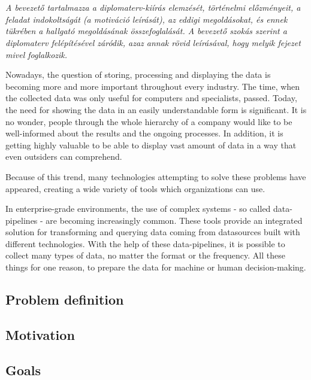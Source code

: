 \chapter{\bevezetes}

\textit{A bevezető tartalmazza a diplomaterv-kiírás elemzését, történelmi előzményeit, a feladat indokoltságát (a motiváció leírását), az eddigi megoldásokat, és ennek tükrében a hallgató megoldásának összefoglalását.
A bevezető szokás szerint a diplomaterv felépítésével záródik, azaz annak rövid leírásával, hogy melyik fejezet mivel foglalkozik.}


Nowadays, the question of storing, processing and displaying the data is becoming more and more important throughout every industry. The time, when the collected data was only useful for computers and specialists, passed. Today, the need for showing the data in an easily understandable form is significant. It is no wonder, people through the whole hierarchy of a company would like to be well-informed about the results and the ongoing processes. In addition, it is getting highly valuable to be able to display vast amount of data in a way that even outsiders can comprehend.

Because of this trend, many technologies attempting to solve these problems have
appeared, creating a wide variety of tools which organizations can use.

In enterprise-grade environments, the use of complex systems - so called data-pipelines - are becoming increasingly common. These tools provide an integrated solution for transforming and querying data coming from datasources built with different technologies. With the help of these data-pipelines, it is possible to collect many types of data, no matter the format or the frequency. All these things for one reason, to prepare the data for machine or human decision-making.

\section{Problem definition}

\section{Motivation}

\section{Goals}
